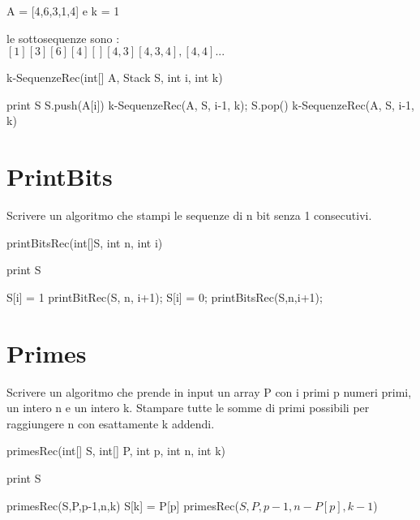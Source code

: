 \documentclass[oneside]{book}
\begin{document}
A = [4,6,3,1,4] e k = 1

le sottosequenze sono :\\
$[1][3][6][4][][4,3][4,3,4],[4,4] ...$

\begin{algorithm}
\caption{k-SequenzeRec(int[] A, Stack S, int i, int k)\label{alg:cap}}
\begin{algorithmic}

	\State print S
\Else
		\State S.push(A[i])
		\State k-SequenzeRec(A, S, i-1, k);
		\State S.pop()
	\EndIf
	\State k-SequenzeRec(A, S, i-1, k)

\EndIf
\end{algorithmic}
\end{algorithm}


\section{PrintBits}
Scrivere un algoritmo che stampi le sequenze di n bit senza 1 consecutivi.

\begin{algorithm}
\caption{printBitsRec(int[]S, int n, int i)\label{alg:cap}}
\begin{algorithmic}
	\State print S
\EndIf

	\State S[i] = 1
	\State printBitRec(S, n, i+1);
\Else
	\State S[i] = 0;
	\State printBitsRec(S,n,i+1);
\EndIf
\end{algorithmic}
\end{algorithm}
\newpage
\section{Primes}
Scrivere un algoritmo che prende in input un array P con i primi p numeri primi, un intero n e un intero k. Stampare tutte le somme di primi possibili per raggiungere n con esattamente k addendi. 

\begin{algorithm}
\caption{primesRec(int[] S, int[] P, int p, int n, int k)\label{alg:cap}}
\begin{algorithmic}
	\State print S
\EndIf

	\State primesRec(S,P,p-1,n,k)
	\State S[k] = P[p]
	\State primesRec($S,P,p-1,n-P[p],k-1$)
\EndIf
\end{algorithmic}
\end{algorithm}
\end{document}
